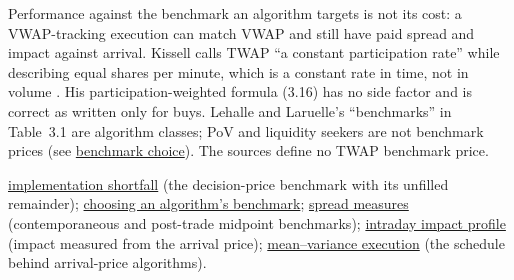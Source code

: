 \begin{qfdefinition}
Performance against the benchmark an algorithm targets is not its cost: a VWAP-tracking execution can match VWAP and still have paid spread and impact against arrival. Kissell calls TWAP ``a constant participation rate'' while describing equal shares per minute, which is a constant rate in time, not in volume \citep[chap.~1, p.~17]{s7-kissellscience}. His participation-weighted formula (3.16) has no side factor and is correct as written only for buys. Lehalle and Laruelle's ``benchmarks'' in Table~3.1 are algorithm classes; PoV and liquidity seekers are not benchmark prices (see \hyperref[meth:algorithm-benchmark-choice]{benchmark choice}). The sources define no TWAP benchmark price.

 \hyperref[def:implementation-shortfall]{implementation shortfall} (the decision-price benchmark with its unfilled remainder); \hyperref[meth:algorithm-benchmark-choice]{choosing an algorithm's benchmark}; \hyperref[def:spread-measures]{spread measures} (contemporaneous and post-trade midpoint benchmarks); \hyperref[ev:intraday-impact-profile]{intraday impact profile} (impact measured from the arrival price); \hyperref[mod:almgren-chriss-execution]{mean--variance execution} (the schedule behind arrival-price algorithms).

\end{qfdefinition}


